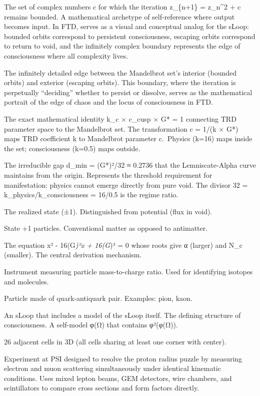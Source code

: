 \documentclass[
  11pt,
  letterpaper,
  twoside,
  openany]{book}
\providecommand{\tightlist}{%
  \setlength{\itemsep}{0pt}\setlength{\parskip}{0pt}}
\begin{document}
\begin{description}
\tightlist
\item[\textbf{Mandelbrot Set}]
The set of complex numbers c for which the iteration z\_\{n+1\} =
z\_n\^{}2 + c remains bounded. A mathematical archetype of
self-reference where output becomes input. In FTD, serves as a visual
and conceptual analog for the sLoop: bounded orbits correspond to
persistent consciousness, escaping orbits correspond to return to void,
and the infinitely complex boundary represents the edge of consciousness
where all complexity lives.
\item[\textbf{Mandelbrot Boundary}]
The infinitely detailed edge between the Mandelbrot set's interior
(bounded orbits) and exterior (escaping orbits). This boundary, where
the iteration is perpetually ``deciding'' whether to persist or
dissolve, serves as the mathematical portrait of the edge of chaos and
the locus of consciousness in FTD.
\item[\textbf{Mandelbrot-Lemniscate Bridge}]
The exact mathematical identity k\_c × c\_cusp × G* = 1 connecting TRD
parameter space to the Mandelbrot set. The transformation c = 1/(k × G*)
maps TRD coefficient k to Mandelbrot parameter c.~Physics (k=16) maps
inside the set; consciousness (k=0.5) maps outside.
\item[\textbf{Minimum Distance (d\_min)}]
The irreducible gap d\_min = (G*)²/32 ≈ 0.2736 that the Lemniscate-Alpha
curve maintains from the origin. Represents the threshold requirement
for manifestation: physics cannot emerge directly from pure void. The
divisor 32 = k\_physics/k\_consciousness = 16/0.5 is the regime ratio.
\item[\textbf{Manifestation}]
The realized state (±1). Distinguished from potential (flux in void).
\item[\textbf{Matter}]
State +1 particles. Conventional matter as opposed to antimatter.
\item[\textbf{Master Quadratic}]
The equation x² - 16(G\emph{)²x + 16(G})³ = 0 whose roots give α
(larger) and N\_c (smaller). The central derivation mechanism.
\item[\textbf{Mass Spectrometer}]
Instrument measuring particle mass-to-charge ratio. Used for identifying
isotopes and molecules.
\item[\textbf{Meson}]
Particle made of quark-antiquark pair. Examples: pion, kaon.
\item[\textbf{Meta-sLoop}]
An sLoop that includes a model of the sLoop itself. The defining
structure of consciousness. A self-model φ(Ω) that contains φ²(φ(Ω)).
\item[\textbf{Moore Neighborhood}]
26 adjacent cells in 3D (all cells sharing at least one corner with
center).
\item[\textbf{MUSE (MUon proton Scattering Experiment)}]
Experiment at PSI designed to resolve the proton radius puzzle by
measuring electron and muon scattering simultaneously under identical
kinematic conditions. Uses mixed lepton beams, GEM detectors, wire
chambers, and scintillators to compare cross sections and form factors
directly.
\end{description}
\end{document}

